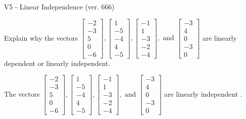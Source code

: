 \begin{exercise}
  \begin{exerciseTitle}V5 - Linear Independence (ver. 666)\end{exerciseTitle}
  \begin{exerciseStatement}
    Explain why the vectors \(\left[\begin{array}{r}
-2 \\
-3 \\
5 \\
0 \\
-6
\end{array}\right] , \left[\begin{array}{r}
1 \\
-5 \\
-4 \\
4 \\
-5
\end{array}\right] , \left[\begin{array}{r}
-1 \\
1 \\
-3 \\
-2 \\
-4
\end{array}\right] , \text{ and } \left[\begin{array}{r}
-3 \\
4 \\
0 \\
-3 \\
0
\end{array}\right]\) are linearly dependent or linearly independent.	


  \end{exerciseStatement}
  \begin{exerciseAnswer}
   The vectors \(\left[\begin{array}{r}
-2 \\
-3 \\
5 \\
0 \\
-6
\end{array}\right] , \left[\begin{array}{r}
1 \\
-5 \\
-4 \\
4 \\
-5
\end{array}\right] , \left[\begin{array}{r}
-1 \\
1 \\
-3 \\
-2 \\
-4
\end{array}\right] , \text{ and } \left[\begin{array}{r}
-3 \\
4 \\
0 \\
-3 \\
0
\end{array}\right]\) are 
  	 linearly independent  .
  


  \end{exerciseAnswer}
\end{exercise}